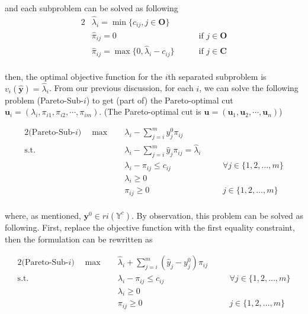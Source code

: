                 and each subproblem can be solved as following
                \begin{alignat*}{2}
                    &\hat{\lambda}_i = \min \{c_{ij}, j \in \mathbf{O}\} \\
                    &\hat{\pi}_{ij} = 0 &&\quad \text{ if } j \in \mathbf{O} \\
                    &\hat{\pi}_{ij} = \max\{0, \hat{\lambda}_i - c_{ij}\} &&\quad \text{ if } j \in \mathbf{C} \\
                \end{alignat*}

                then, the optimal objective function for the $i$th separated subproblem is $v_i(\mathbf{\hat{y}}) = \hat{\lambda}_i$. From our previous discussion, for each $i$, we can solve the following problem (Pareto-Sub-$i$) to get (part of) the Pareto-optimal cut $\mathbf{u}_{i} = (\lambda_i, \pi_{i1}, \pi_{i2}, \cdots, \pi_{im})$. (The Pareto-optimal cut is $\mathbf{u} = (\mathbf{u}_1, \mathbf{u}_2, \cdots, \mathbf{u}_n)$)

                \begin{alignat*}{2}
                    \text{(Pareto-Sub-$i$)} \quad \max \quad & \lambda_i - \sum_{j = i}^m y^0_j \pi_{ij}\\
                    \text{s.t.} \quad & \lambda_i - \sum_{j = i}^m \hat{y}_j \pi_{ij} = \hat{\lambda}_i\\
                                      & \lambda_i - \pi_{ij} \le c_{ij}                  && \quad \forall j \in \{1, 2, \ldots, m\}\\
                                      & \lambda_i \ge 0                                  && \\
                                      & \pi_{ij} \ge 0                                   && \quad j \in \{1, 2, \ldots, m\}\\
                \end{alignat*}

                where, as mentioned, $\mathbf{y}^0 \in ri(\mathbb{Y}^c)$. By observation, this problem can be solved as following. First, replace the objective function with the first equality constraint, then the formulation can be rewritten as

                \begin{alignat*}{2}
                    \text{(Pareto-Sub-$i$)} \quad \max \quad & \hat{\lambda}_i + \sum_{j = i}^m (\hat{y}_j - y_j^0) \pi_{ij}\\
                    \text{s.t.} \quad & \lambda_i - \pi_{ij} \le c_{ij}                  && \quad \forall j \in \{1, 2, \ldots, m\}\\
                                      & \lambda_i \ge 0                                  && \\
                                      & \pi_{ij} \ge 0                                   && \quad j \in \{1, 2, \ldots, m\}\\
                \end{alignat*}

